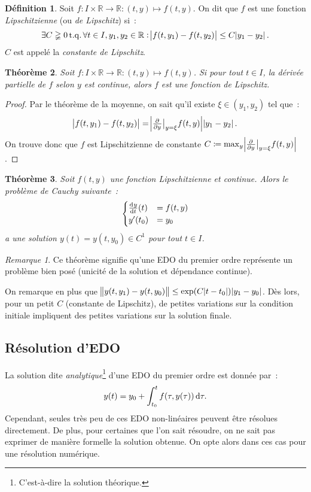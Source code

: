 \documentclass{article}
\newtheorem{thm}{Théorème}[section]
\theoremstyle{definition}
\newtheorem{déf}[thm]{Définition}
\theoremstyle{remark}
\newtheorem*{rmq}{Remarque}
\DeclareMathOperator{\tq}{t.q.}  %
\newcommand{\R}{\mathbb R}
\begin{document}
		\begin{déf} Soit $f : I \times \R \to \R : (t, y) \mapsto f(t, y)$. On dit que $f$ est une fonction \emph{Lipschitzienne} (ou \emph{de Lipschitz}) si~:
		\[\exists C \gneqq 0 \tq \forall t \in I, y_1, y_2 \in \R : \abs{f(t, y_1) - f(t, y_2)} \leq C\abs{y_1-y_2}.\]
		$C$ est appelé la \emph{constante de Lipschitz}.
		\end{déf}

		\begin{thm} Soit $f : I \times \R \to \R : (t, y) \mapsto f(t, y)$. Si pour tout $t \in I$, la dérivée partielle de $f$ selon $y$ est continue, alors
		$f$ est une fonction de Lipschitz.
		\end{thm}

		\begin{proof} Par le théorème de la moyenne, on sait qu'il existe $\xi \in (y_1, y_2)$ tel que~:
		\[\abs{f(t, y_1)-f(t, y_2)} = \abs{\pd {}y\big\rvert_{y=\xi}f(t, y)}\abs{y_1-y_2}.\]
		On trouve donc que $f$ est Lipschitzienne de constante $C \coloneqq \max_y\abs{\pd {}y\big\rvert_{y=\xi}f(t, y)}$.
		\end{proof}

		\begin{thm} Soit $f(t, y)$ une fonction Lipschitzienne et continue. Alors le problème de Cauchy suivante~:
		\[\begin{cases}\od yt(t) &= f(t, y) \\y'(t_0) &= y_0\end{cases}\]
		a une solution $y(t) = y(t, y_0) \in C^1$ pour tout $t \in I$.
		\end{thm}

		\begin{rmq} Ce théorème signifie qu'une EDO du premier ordre représente un problème bien posé (unicité de la solution et dépendance continue). \end{rmq}

		On remarque en plus que $\norm{y(t, y_1) - y(t, y_0)} \leq \exp(C\abs{t-t_0})\abs{y_1-y_0}$. Dès lors, pour un petit $C$ (constante de Lipschitz),
		de petites variations sur la condition initiale impliquent des petites variations sur la solution finale.

	\subsection{Résolution d'EDO}
		La solution dite \emph{analytique}\footnote{C'est-à-dire la solution théorique.} d'une EDO du premier ordre est donnée par~:
		\[y(t) = y_0 + \int_{t_0}^tf(\tau, y(\tau))\dif\tau.\]
		Cependant, seules très peu de ces EDO non-linéaires peuvent être résolues directement. De plus, pour certaines que l'on sait résoudre, on ne sait pas
		exprimer de manière formelle la solution obtenue. On opte alors dans ces cas pour une résolution numérique.
\end{document}
